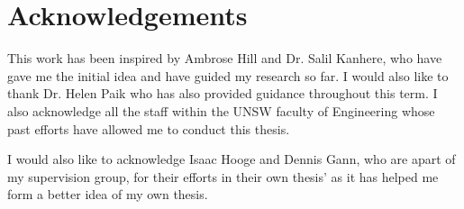 \chapter*{Acknowledgements}\label{ack}

This work has been inspired by Ambrose Hill and Dr. Salil Kanhere, who have gave me the initial idea and have guided my research so far. I would also like to thank Dr. Helen Paik who has also provided guidance throughout this term. I also acknowledge all the staff within the UNSW faculty of Engineering whose past efforts have allowed me to conduct this thesis. 

I would also like to acknowledge Isaac Hooge and Dennis Gann, who are apart of my supervision group, for their efforts in their own thesis' as it has helped me form a better idea of my own thesis.

